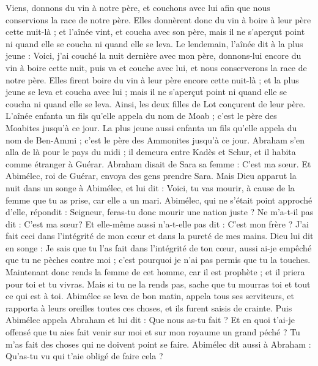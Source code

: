 \begin{multicols}{2}
Viens, donnons du vin à notre père, et couchons avec lui  afin que nous conservions la race de notre père.
Elles donnèrent donc du vin à boire à leur père cette nuit-là ; et l'aînée vint, et coucha avec son père, mais il ne s'aperçut point ni quand elle se coucha ni quand elle se leva.
Le lendemain, l'aînée dit à la plus jeune : Voici, j'ai couché la nuit dernière avec mon père, donnons-lui encore du vin à boire cette nuit, puis va et couche avec lui, et nous conserverons la race de notre père.
Elles firent boire du vin à leur père encore cette nuit-là ; et la plus jeune se leva et coucha avec lui ; mais il ne s'aperçut point ni quand elle se coucha ni quand elle se leva.
Ainsi, les deux filles de Lot conçurent de leur père.
L’aînée enfanta un fils qu’elle appela du nom de Moab ; c'est le père des Moabites jusqu'à ce jour.
La plus jeune aussi enfanta un fils qu’elle appela du nom de Ben-Ammi ; c'est le père des Ammonites jusqu'à ce jour.
\VerseOne{}Abraham s'en alla de là pour le pays du midi ; il demeura entre Kadès et Schur, et il habita comme étranger à Guérar.
Abraham disait de Sara sa femme : C'est ma sœur. Et Abimélec, roi de Guérar, envoya des gens prendre Sara.
Mais Dieu apparut la nuit dans un songe à Abimélec, et lui dit : Voici, tu vas mourir, à cause de la femme que tu as prise, car elle a un mari.
Abimélec, qui ne s'était point approché d'elle, répondit : Seigneur, feras-tu donc mourir une nation juste ?
Ne m'a-t-il pas dit : C'est ma sœur? Et elle-même aussi n'a-t-elle pas dit : C'est mon frère ? J'ai fait ceci dans l'intégrité de mon cœur et dans la pureté de mes mains.
Dieu lui dit en songe : Je sais que tu l'as fait dans l'intégrité de ton cœur, aussi ai-je empêché que tu ne pèches contre moi ; c'est pourquoi je n'ai pas permis que tu la touches.
Maintenant donc rends la femme de cet homme, car il est prophète ; et il priera pour toi et tu vivras. Mais si tu ne la rends pas, sache que tu mourras toi et tout ce qui est à toi.
Abimélec se leva de bon matin, appela tous ses serviteurs, et rapporta à leurs oreilles  toutes ces choses, et ils furent saisis de crainte.
Puis Abimélec appela Abraham et lui dit : Que nous as-tu fait ? Et en quoi t'ai-je offensé que tu aies fait venir sur moi et sur mon royaume un grand péché ? Tu m'as fait des choses qui ne doivent point se faire.
Abimélec dit aussi à Abraham : Qu'as-tu vu qui t'aie obligé de faire cela ?

\end{multicols}
